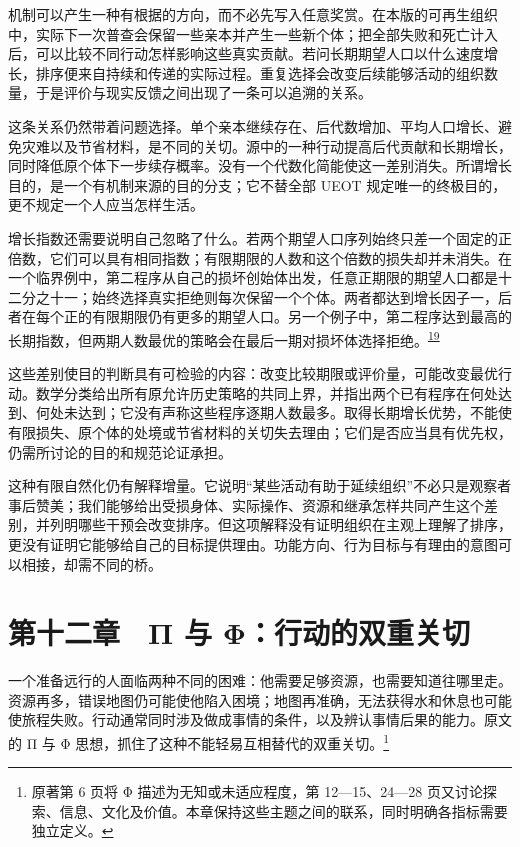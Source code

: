 \documentclass[
  11pt,
  oneside]{book}
\begin{document}
机制可以产生一种有根据的方向，而不必先写入任意奖赏。在本版的可再生组织中，实际下一次普查会保留一些亲本并产生一些新个体；把全部失败和死亡计入后，可以比较不同行动怎样影响这些真实贡献。若问长期期望人口以什么速度增长，排序便来自持续和传递的实际过程。重复选择会改变后续能够活动的组织数量，于是评价与现实反馈之间出现了一条可以追溯的关系。

这条关系仍然带着问题选择。单个亲本继续存在、后代数增加、平均人口增长、避免灾难以及节省材料，是不同的关切。源中的一种行动提高后代贡献和长期增长，同时降低原个体下一步续存概率。没有一个代数化简能使这一差别消失。所谓增长目的，是一个有机制来源的目的分支；它不替全部 UEOT 规定唯一的终极目的，更不规定一个人应当怎样生活。

增长指数还需要说明自己忽略了什么。若两个期望人口序列始终只差一个固定的正倍数，它们可以具有相同指数；有限期限的人数和这个倍数的损失却并未消失。在一个临界例中，第二程序从自己的损坏创始体出发，任意正期限的期望人口都是十二分之十一；始终选择真实拒绝则每次保留一个个体。两者都达到增长因子一，后者在每个正的有限期限仍有更多的期望人口。另一个例子中，第二程序达到最高的长期指数，但两期人数最优的策略会在最后一期对损坏体选择拒绝。\textsuperscript{\hyperlink{ph-note-19}{19}}

这些差别使目的判断具有可检验的内容：改变比较期限或评价量，可能改变最优行动。数学分类给出所有原允许历史策略的共同上界，并指出两个已有程序在何处达到、何处未达到；它没有声称这些程序逐期人数最多。取得长期增长优势，不能使有限损失、原个体的处境或节省材料的关切失去理由；它们是否应当具有优先权，仍需所讨论的目的和规范论证承担。

\begingroup{}

这种有限自然化仍有解释增量。它说明``某些活动有助于延续组织''不必只是观察者事后赞美；我们能够给出受损身体、实际操作、资源和继承怎样共同产生这个差别，并列明哪些干预会改变排序。但这项解释没有证明组织在主观上理解了排序，更没有证明它能够给自己的目标提供理由。功能方向、行为目标与有理由的意图可以相接，却需不同的桥。

\par\endgroup

\chapter{第十二章　Π 与 Φ：行动的双重关切}\label{ph-ch-12}

一个准备远行的人面临两种不同的困难：他需要足够资源，也需要知道往哪里走。资源再多，错误地图仍可能使他陷入困境；地图再准确，无法获得水和休息也可能使旅程失败。行动通常同时涉及做成事情的条件，以及辨认事情后果的能力。原文的 Π 与 Φ 思想，抓住了这种不能轻易互相替代的双重关切。\footnote{\hypertarget{ph-note-34}{}原著第 6 页将 Φ 描述为无知或未适应程度，第 12---15、24---28 页又讨论探索、信息、文化及价值。本章保持这些主题之间的联系，同时明确各指标需要独立定义。}
\end{document}
